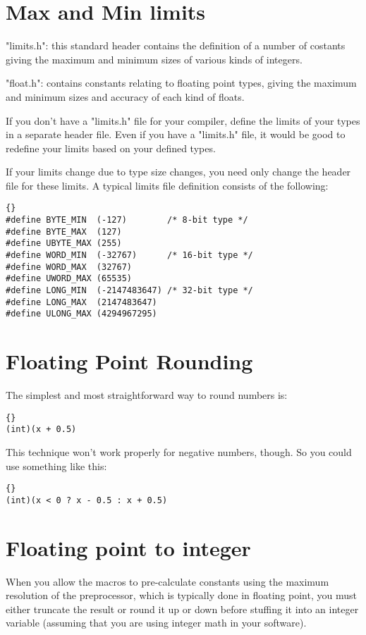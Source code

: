\documentclass{report}
\begin{document}
\section{Max and Min limits}
"limits.h": this standard header contains the definition of a number of costants giving the maximum and minimum sizes of various kinds of integers.

"float.h": contains constants relating to floating point types, giving the maximum and minimum sizes and accuracy of each kind of floats.

If you don't have a "limits.h" file for your compiler, define the limits of your types in a separate header file. Even if you have a "limits.h" file, it would be good to redefine your limits based on your defined types.

If your limits change due to type size changes, you need only change the header file for these limits. A typical limits file definition consists of the following: 
\begin{lstlisting}{}
#define BYTE_MIN  (-127)        /* 8-bit type */
#define BYTE_MAX  (127)
#define UBYTE_MAX (255)
#define WORD_MIN  (-32767)      /* 16-bit type */
#define WORD_MAX  (32767)
#define UWORD_MAX (65535)
#define LONG_MIN  (-2147483647) /* 32-bit type */
#define LONG_MAX  (2147483647)
#define ULONG_MAX (4294967295)
\end{lstlisting}

\section{Floating Point Rounding}	
The simplest and most straightforward way to round numbers is:
\begin{lstlisting}{}
(int)(x + 0.5)
\end{lstlisting}
This technique won't work properly for negative numbers, though. So you could use something like this:
\begin{lstlisting}{}
(int)(x < 0 ? x - 0.5 : x + 0.5)
\end{lstlisting}

\section{Floating point to integer}
When you allow the macros to pre-calculate constants using the maximum resolution of the preprocessor, which is typically done in floating point, you must either truncate the result or round it up or down before stuffing it into an integer variable (assuming that you are using integer math in your software).
\end{document}
